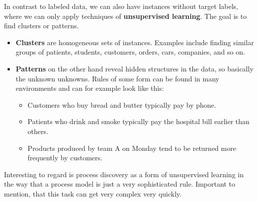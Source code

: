 In contrast to labeled data, we can also have instances without target labels, where we can only apply techniques of \textbf{unsupervised learning}. The goal is to find clusters or patterns.
\begin{itemize}
  \item \textbf{Clusters} are homogeneous sets of instances. Examples include finding similar groups of patients, students, customers, orders, cars, companies, and so on.
  \item \textbf{Patterns} on the other hand reveal hidden structures in the data, so basically the unknown unknowns. Rules of some form can be found in many environments and can for example look like this:
  \begin{itemize}
    \item Customers who buy bread and butter typically pay by phone.
    \item Patients who drink and smoke typically pay the hospital bill earlier than others.
    \item Products produced by team A on Monday tend to be returned more frequently by customers.
  \end{itemize} 
\end{itemize}

Interesting to regard is process discovery as a form of unsupervised learning in the way that a process model is just a very sophisticated rule. Important to mention, that this task can get very complex very quickly.
